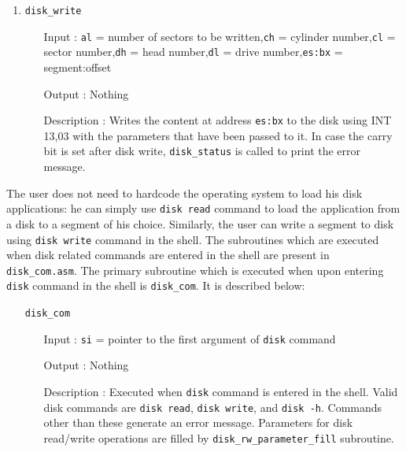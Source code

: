 \begin{enumerate}
\begin{enumerate}[align=parleft, labelsep=2cm, leftmargin=1.06in]
  		\end{enumerate}
  \item \texttt{disk\_write}
  		\begin{enumerate}[align=parleft, labelsep=2cm, leftmargin=1.06in]
  		  \item[Input]: \texttt{al} = number of sectors to be written,\newline\texttt{ch} = cylinder number,\newline\texttt{cl} = sector number,\newline\texttt{dh} = head number,\newline\texttt{dl} = drive number,\newline\texttt{es:bx} = segment:offset
  		  \item[Output]: Nothing
  		  \item[Description]: Writes the content at address \texttt{es:bx} to the disk using INT 13,03 with the parameters that have been passed to it. In case the carry bit is set after disk write, \texttt{disk\_status} is called to print the error message.
  		\end{enumerate}
\end{enumerate}

The user does not need to hardcode the operating system to load his disk applications: he can simply use \texttt{disk read} command to load the application from a disk to a segment of his choice. Similarly, the user can write a segment to disk using \texttt{disk write} command in the shell. The subroutines which are executed when disk related commands are entered in the shell are present in \texttt{disk\_com.asm}. The primary subroutine which is executed when upon entering \texttt{disk} command in the shell is \texttt{disk\_com}. It is described below:
\begin{enumerate}
  \item[] \texttt{disk\_com}
  		\begin{enumerate}[align=parleft, labelsep=2cm, leftmargin=1.06in]
  		  \item[Input]: \texttt{si} = pointer to the first argument of \texttt{disk} command
  		  \item[Output]: Nothing
  		  \item[Description]: Executed when \texttt{disk} command is entered in the shell. Valid disk commands are \texttt{disk read}, \texttt{disk write}, and \texttt{disk -h}. Commands other than these generate an error message. Parameters for disk read/write operations are filled by \texttt{disk\_rw\_parameter\_fill} subroutine.
  		\end{enumerate}
\end{enumerate}

